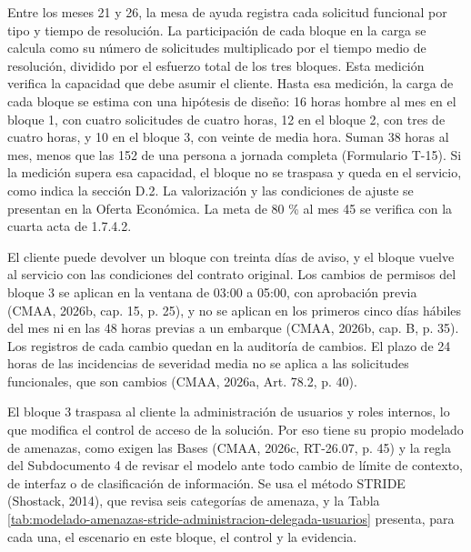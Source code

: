 \documentclass[anexo]{../../comun/overfore}
\begin{document}
Entre los meses 21 y 26, la mesa de ayuda registra cada solicitud funcional por tipo y tiempo de resolución. La participación de cada bloque en la carga se calcula como su número de solicitudes multiplicado por el tiempo medio de resolución, dividido por el esfuerzo total de los tres bloques. Esta medición verifica la capacidad que debe asumir el cliente. Hasta esa medición, la carga de cada bloque se estima con una hipótesis de diseño: 16 horas hombre al mes en el bloque 1, con cuatro solicitudes de cuatro horas, 12 en el bloque 2, con tres de cuatro horas, y 10 en el bloque 3, con veinte de media hora. Suman 38 horas al mes, menos que las 152 de una persona a jornada completa (Formulario T-15). Si la medición supera esa capacidad, el bloque no se traspasa y queda en el servicio, como indica la sección D.2. La valorización y las condiciones de ajuste se presentan en la Oferta Económica. La meta de 80 \% al mes 45 se verifica con la cuarta acta de 1.7.4.2.

El cliente puede devolver un bloque con treinta días de aviso, y el bloque vuelve al servicio con las condiciones del contrato original. Los cambios de permisos del bloque 3 se aplican en la ventana de 03:00 a 05:00, con aprobación previa (CMAA, 2026b, cap. 15, p. 25), y no se aplican en los primeros cinco días hábiles del mes ni en las 48 horas previas a un embarque (CMAA, 2026b, cap. B, p. 35). Los registros de cada cambio quedan en la auditoría de cambios. El plazo de 24 horas de las incidencias de severidad media no se aplica a las solicitudes funcionales, que son cambios (CMAA, 2026a, Art. 78.2, p. 40).

El bloque 3 traspasa al cliente la administración de usuarios y roles internos, lo que modifica el control de acceso de la solución. Por eso tiene su propio modelado de amenazas, como exigen las Bases (CMAA, 2026c, RT-26.07, p. 45) y la regla del Subdocumento 4 de revisar el modelo ante todo cambio de límite de contexto, de interfaz o de clasificación de información. Se usa el método STRIDE (Shostack, 2014), que revisa seis categorías de amenaza, y la Tabla \ref{tab:modelado-amenazas-stride-administracion-delegada-usuarios} presenta, para cada una, el escenario en este bloque, el control y la evidencia.
\end{document}
